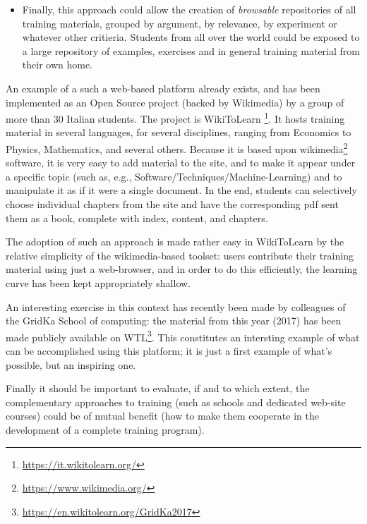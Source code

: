 \begin{itemize}[itemsep=0pt,parsep=0pt,topsep=5pt,partopsep=0pt]
   \item Finally, this approach could allow the creation of {\it browsable} repositories of all training materials, grouped by argument, by relevance, by experiment or whatever other critieria. Students from all over the world could be exposed to a large repository of examples, exercises and in general training material from their own home.
\end{itemize}

An example of a such a web-based platform already exists, and has been implemented as an Open Source project (backed by Wikimedia) by a group of more than 30 Italian students. The project is WikiToLearn \footnote{\url{https://it.wikitolearn.org/}}. It hosts training material in several languages, for several disciplines, ranging from Economics to Physics, Mathematics, and several others. Because it is based upon wikimedia\footnote{\url{https://www.wikimedia.org/}} software, it is very easy to add material to the site, and to make it appear under a specific topic (such as, e.g., Software/Techniques/Machine-Learning) and to manipulate it as if it were a single document. In the end, students can selectively choose individual chapters from the site and have the corresponding pdf sent them as a book, complete with index, content, and chapters. 

The adoption of such an approach is made rather easy in WikiToLearn by the relative simplicity of the wikimedia-based toolset: users contribute their training material using just a web-browser, and in order to do this efficiently, the learning curve has been kept appropriately shallow.

An interesting exercise in this context has recently been made by colleagues of the GridKa School of computing: the material from this year (2017) has been made publicly available on WTL\footnote{\url{https://en.wikitolearn.org/GridKa2017}}. This constitutes an intersting example of what can be accomplished using this platform; it is just a first example of what's possible, but an inspiring one.

Finally it should be important to evaluate, if and to which extent, the complementary approaches to training (such as schools and dedicated web-site courses) could be of mutual benefit (how to make them cooperate in the development of a complete training program).


